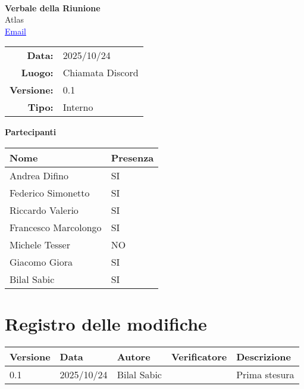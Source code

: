 \documentclass[a4paper,12pt]{article}
\makeatletter
\newcommand{\Gruppo}{Atlas}
\newcommand{\Email}{\href{mailto:team9.atlas@gmail.com}{\textcolor{blue}{\underline{Email}}}}
\newcommand{\TitoloVerbale}{Verbale della Riunione}
\newcommand{\DataVerbale}{2025/10/24}
\newcommand{\LuogoVerbale}{Chiamata Discord}
\newcommand{\LogoGruppo}{img/AtlasLogo.png} %
\newcommand{\VersioneVerbale}{0.1} %
\newcommand{\VerbaleInterno}{Interno}
\makeatother
\begin{document}
\begin{titlepage}
    \centering

    \vspace*{0cm}
    \\
    [.5cm]
    {\Huge \textbf{\TitoloVerbale}}\\[0.8cm]
    {\LARGE \Gruppo}\\[0.1cm]
    {\Email}\\[1.2cm]

    \begin{tabular}{rl}
        \textbf{Data:} & \DataVerbale \\
        \textbf{Luogo:} & \LuogoVerbale \\
        \textbf{Versione:} & \VersioneVerbale \\
        \textbf{Tipo:} & \VerbaleInterno \\
    \end{tabular}

    \vspace{1.2cm}

    {\large \textbf{Partecipanti}}\\[0.5cm]
    \begin{tabular}{l|l}
        \textbf{Nome} & \textbf{Presenza} \\
        \hline
        Andrea Difino & SI \\
        Federico Simonetto & SI \\
        Riccardo Valerio & SI \\
        Francesco Marcolongo & SI \\
        Michele Tesser & NO \\
        Giacomo Giora & SI \\
        Bilal Sabic & SI \\
    \end{tabular}

\end{titlepage}

\section*{Registro delle modifiche}{
    \begin{center} 
        \begin{tabular}{|l|l|l|l|l|}
            \hline
            \textbf{Versione} & \textbf{Data} & \textbf{Autore} & \textbf{Verificatore} & \textbf{Descrizione} \\
            \hline
             \VersioneVerbale & 2025/10/24 & Bilal Sabic & & Prima stesura \\
            \hline
        \end{tabular}
    \end{center}
}
\end{document}

